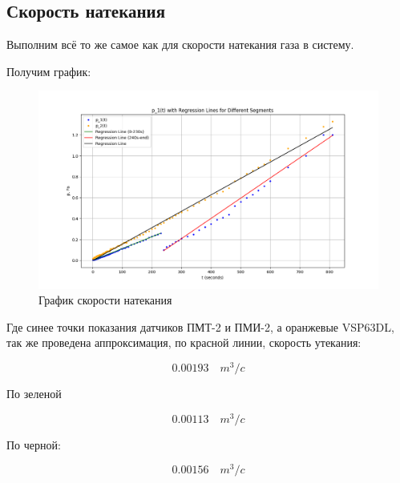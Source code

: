 \documentclass[12pt,oneside,a4paper]{article}
\begin{document}
\subsection{Скорость натекания}

Выполним всё то же самое как для скорости натекания газа в систему.

Получим график:
\newpage
\begin{figure}[!ht]
    \centering
    \includegraphics[width=1\linewidth]{garf_3.png}
    \caption{График скорости натекания}
    \label{fig:enter-label}
\end{figure}

 Где синее точки показания датчиков ПМТ-2 и ПМИ-2, а оранжевые VSP63DL, так же проведена аппроксимация, по красной линии, скорость утекания:

 $$0.00193 \quad m^3/c$$
 
По зеленой

$$0.00113  \quad m^3/c$$

По черной:

$$0.00156 \quad m^3/c$$
\end{document}
